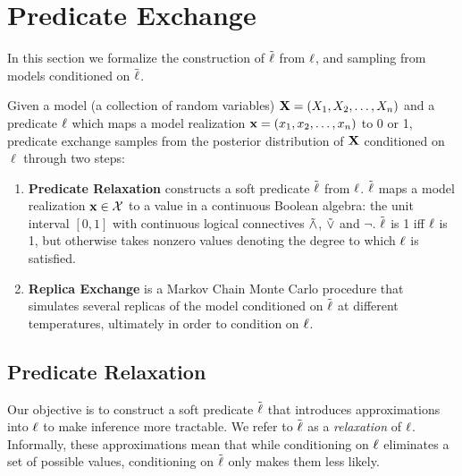 \section{Predicate Exchange}
In this section we formalize the construction of $\mathrel{\tilde{\operatorname{\ell}}}$ from $\operatorname{\ell}$, and sampling from models conditioned on $\mathrel{\tilde{\operatorname{\ell}}}$.


Given a model (a collection of random variables)  $\mathbf{X} = (X_1, X_2, \dots, X_n)$ and a predicate $\operatorname{\ell}$ which maps a model realization  $\mathbf{x} = (x_1, x_2, \dots, x_n)$ to 0 or 1, predicate exchange samples from the posterior distribution of $\mathbf{X}$ conditioned on $\ell$ through two steps:
\begin{enumerate}
\item \textbf{Predicate Relaxation} constructs a soft predicate $\mathrel{\tilde{\operatorname{\ell}}}$ from $\operatorname{\ell}$. $\mathrel{\tilde{\operatorname{\ell}}}$ maps a model realization $\mathbf{x} \in {\mathcal{X}}$ to a value in a continuous Boolean algebra: the unit interval $[0, 1]$ with continuous logical connectives $\mathrel{\tilde{\land}}$, $\mathrel{\tilde{\lor}}$ and $\neg$.
$\mathrel{\tilde{\operatorname{\ell}}}$ is 1 iff $\operatorname{\ell}$ is 1, but otherwise takes nonzero values denoting the degree to which $\operatorname{\ell}$ is satisfied.
\item  \textbf{Replica Exchange} is a Markov Chain Monte Carlo procedure that simulates several replicas  of the model conditioned on $\mathrel{\tilde{\operatorname{\ell}}}$ at different temperatures, ultimately in order to condition on $\operatorname{\ell}$. 
\end{enumerate}


\subsection{Predicate Relaxation}\label{predexchange}

Our objective is to construct a soft predicate $\mathrel{\tilde{\operatorname{\ell}}}$ that introduces approximations into $\operatorname{\ell}$ to make inference more tractable.
We refer to $\mathrel{\tilde{\operatorname{\ell}}}$ as a \emph{relaxation} of $\operatorname{\ell}$.
Informally, these approximations mean that while conditioning on $\operatorname{\ell}$ eliminates a set of possible values, conditioning on $\mathrel{\tilde{\operatorname{\ell}}}$ only makes them less likely.

